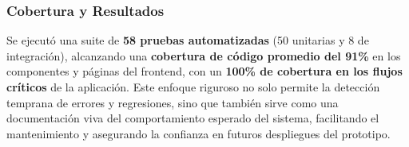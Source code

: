 \subsubsection{Cobertura y Resultados}

Se ejecutó una suite de \textbf{58 pruebas automatizadas} (50 unitarias y 8 de integración), alcanzando una \textbf{cobertura de código promedio del 91\%} en los componentes y páginas del frontend, con un \textbf{100\% de cobertura en los flujos críticos} de la aplicación. Este enfoque riguroso no solo permite la detección temprana de errores y regresiones, sino que también sirve como una documentación viva del comportamiento esperado del sistema, facilitando el mantenimiento y asegurando la confianza en futuros despliegues del prototipo.

